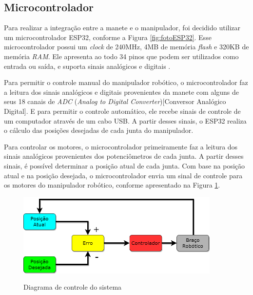 \subsection[Microcontrolador]{Microcontrolador}
\label{sub:microcontrolador}

Para realizar a integração entre a manete e o manipulador, foi decidido utilizar um microcontrolador ESP32, conforme a Figura \ref{fig:fotoESP32}.
Esse microcontrolador possui um \textit{clock} de 240MHz, 4MB de memória \textit{flash} e 320KB de memória \textit{RAM}.
Ele apresenta ao todo 34 pinos que podem ser utilizados como entrada ou saída, e suporta sinais analógicos e digitais \cite{esp32_datasheet}.

Para permitir o controle manual do manipulador robótico, o microcontrolador faz a leitura dos sinais analógicos e digitais provenientes da manete com alguns de seus 18 canais de \textit{ADC} (\textit{Analog to Digital Converter})[Conversor Analógico Digital].
E para permitir o controle automático, ele recebe sinais de controle de um computador através de um cabo USB.
A partir desses sinais, o ESP32 realiza o cálculo das posições desejadas de cada junta do manipulador.

Para controlar os motores, o microcontrolador primeiramente faz a leitura dos sinais analógicos provenientes dos potenciômetros de cada junta.
A partir desses sinais, é possível determinar a posição atual de cada junta.
Com base na posição atual e na posição desejada, o microcontrolador envia um sinal de controle para os motores do manipulador robótico, 
conforme apresentado na Figura \ref{fig:diagramaControle}.

\begin{figure}[H]
    \centering
    \caption{Diagrama de controle do sistema}
    \includegraphics[keepaspectratio=true, width=0.9\textwidth]
    	{img/Diagrama Controle.png}
    \label{fig:diagramaControle}
\end{figure}

